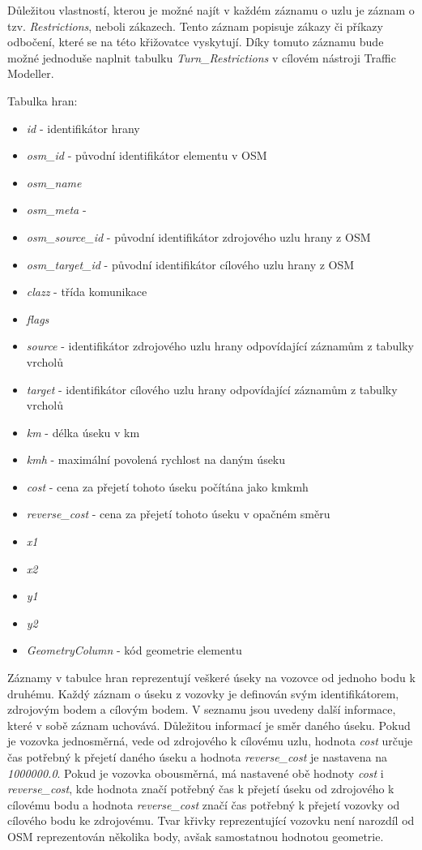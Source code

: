 Důležitou vlastností, kterou je možné najít v každém záznamu o uzlu je záznam o tzv. \textit{Restrictions}, neboli zákazech. Tento záznam popisuje zákazy či příkazy odbočení, které se na této křižovatce vyskytují. Díky tomuto záznamu bude možné jednoduše naplnit tabulku \textit{Turn\_Restrictions} v cílovém nástroji Traffic Modeller.

Tabulka hran:
\begin{itemize}
  \item \textit{id} - identifikátor hrany
  \item \textit{osm\_id} - původní identifikátor elementu v OSM
  \item \textit{osm\_name} 
  \item \textit{osm\_meta} - 
  \item \textit{osm\_source\_id} - původní identifikátor zdrojového uzlu hrany z OSM
  \item \textit{osm\_target\_id} - původní identifikátor cílového uzlu hrany z OSM
  \item \textit{clazz} - třída komunikace
  \item \textit{flags}
  \item \textit{source} - identifikátor zdrojového uzlu hrany odpovídající záznamům z tabulky vrcholů
  \item \textit{target} - identifikátor cílového uzlu hrany odpovídající záznamům z tabulky vrcholů
  \item \textit{km} - délka úseku v km
  \item \textit{kmh} - maximální povolená rychlost na daným úseku
  \item \textit{cost} - cena za přejetí tohoto úseku počítána jako km\/kmh
  \item \textit{reverse\_cost} - cena za přejetí tohoto úseku v opačném směru
  \item \textit{x1} 
  \item \textit{x2}
  \item \textit{y1}
  \item \textit{y2}
  \item \textit{GeometryColumn} - kód geometrie elementu
\end{itemize}

Záznamy v tabulce hran reprezentují veškeré úseky na vozovce od jednoho bodu k druhému. Každý záznam o úseku z vozovky je definován svým identifikátorem, zdrojovým bodem a cílovým bodem. V seznamu jsou uvedeny další informace, které v sobě záznam uchovává. Důležitou informací je směr daného úseku. Pokud je vozovka jednosměrná, vede od zdrojového k cílovému uzlu, hodnota \textit{cost} určuje čas potřebný k přejetí daného úseku a hodnota \textit{reverse\_cost} je nastavena na \textit{1000000.0}. Pokud je vozovka obousměrná, má nastavené obě hodnoty \textit{cost} i \textit{reverse\_cost}, kde hodnota  značí potřebný čas k přejetí úseku od zdrojového k cílovému bodu a hodnota \textit{reverse\_cost} značí čas potřebný k přejetí vozovky od cílového bodu ke zdrojovému. Tvar křivky reprezentující vozovku není narozdíl od OSM reprezentován několika body, avšak samostatnou hodnotou geometrie. 

